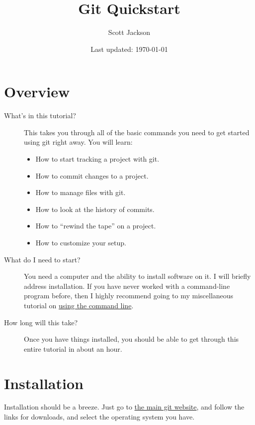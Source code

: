 \documentclass{article}
\title{Git Quickstart}
\author{Scott Jackson}
\date{Last updated: \today}
\begin{document}
\maketitle

\setcounter{tocdepth}{3}
\tableofcontents
\vspace*{1cm}


\newpage
\section{Overview}
\label{sec-1}

\begin{description}
\item[What's in this tutorial?] This takes you through all of the basic commands you need to get started using git right away. You will learn:
\begin{itemize}
\item How to start tracking a project with git.
\item How to commit changes to a project.
\item How to manage files with git.
\item How to look at the history of commits.
\item How to ``rewind the tape'' on a project.
\item How to customize your setup.
\end{itemize}
\item[What do I need to start?] You need a computer and the ability to install software on it. I will briefly address installation.  If you have never worked with a command-line program before, then I highly recommend going to my miscellaneous tutorial on \href{https://github.com/shoestringpsycholing/rrr_tools/misc_tutorials/}{using the command line}.
\item[How long will this take?] Once you have things installed, you should be able to get through this entire tutorial in about an hour.
\end{description}
\section{Installation}
\label{sec-2}

Installation should be a breeze. Just go to \href{http://git-scm.com}{the main git website}, and follow the links for downloads, and select the operating system you have.
\end{document}
